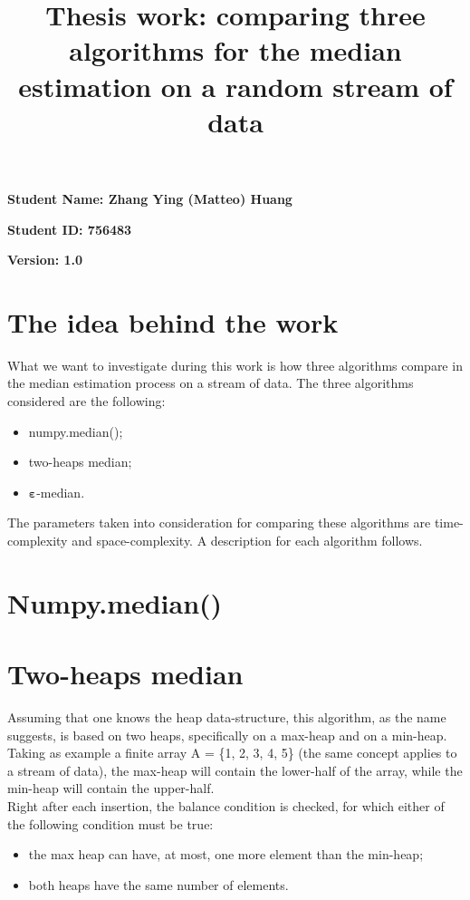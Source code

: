 \documentclass[paper=a4wide, fontsize=12pt]{scrartcl}	 %
\title{ \color{DarkRed}Thesis work: comparing three algorithms for the median estimation on a random stream of data\vspace{-1.5em}}
\date{} %
\begin{document}
\maketitle %
\thispagestyle{fancy} %


\vspace{-0.5cm} \textbf{Student Name: Zhang Ying (Matteo) Huang}

\textbf{Student ID: 756483}

\textbf{Version: 1.0}

\vspace{0.5cm}

\section*{The idea behind the work}

What we want to investigate during this work is how three algorithms compare in the median estimation process on a stream of data.
The three algorithms considered are the following:
\begin{itemize}
    \item numpy.median();
    \item two-heaps median;
    \item $\mathbf{\varepsilon}$-median.
\end{itemize}
The parameters taken into consideration for comparing these algorithms are time-complexity and space-complexity.
A description for each algorithm follows.

\section*{Numpy.median()}

\section*{Two-heaps median}
Assuming that one knows the heap data-structure, this algorithm, as the name suggests, is based on two heaps, specifically on a max-heap and on a min-heap. \\
Taking as example a finite array A = \{1, 2, 3, 4, 5\} (the same concept applies to a stream of data), the max-heap will contain the lower-half of the array, while the min-heap will contain the upper-half. \\
Right after each insertion, the balance condition is checked, for which either of the following condition must be true:
\begin{itemize}
    \item the max heap can have, at most, one more element than the min-heap;
    \item both heaps have the same number of elements.
\end{itemize}
\end{document}
